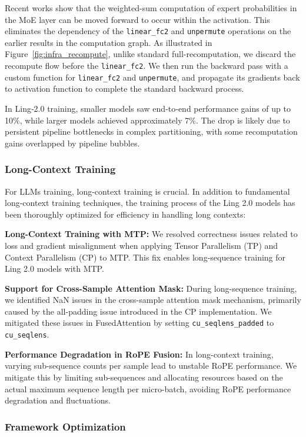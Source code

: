 Recent works show that the weighted-sum computation of expert probabilities in the MoE layer can be moved forward to occur within the activation. This eliminates the dependency of the \verb|linear_fc2| and \verb|unpermute| operations on the earlier results in the computation graph.
As illustrated in Figure~\ref{fig:infra_recompute}, unlike standard full-recomputation, we discard the recompute flow before the \verb|linear_fc2|. We then run the backward pass with a custom function for \verb|linear_fc2| and \verb|unpermute|, and propagate its gradients back to activation function to complete the standard backward process.

In Ling‑2.0 training, smaller models saw end‑to‑end performance gains of up to 10\%, while larger models achieved approximately 7\%. The drop is likely due to persistent pipeline bottlenecks in complex partitioning, with some recomputation gains overlapped by pipeline bubbles.

\subsubsection{Long-Context Training}

For LLMs training, long-context training is crucial. In addition to fundamental long-context training techniques, the training process of the Ling 2.0 models has been thoroughly optimized for efficiency in handling long contexts:

\textbf{Long-Context Training with MTP:} We resolved correctness issues related to loss and gradient misalignment when applying Tensor Parallelism (TP) and Context Parallelism (CP) to MTP. This fix enables long-sequence training for Ling 2.0 models with MTP.

\textbf{Support for Cross-Sample Attention Mask:} During long-sequence training, we identified NaN issues in the cross-sample attention mask mechanism, primarily caused by the all-padding issue introduced in the CP implementation. We mitigated these issues in FusedAttention by setting \verb|cu_seqlens_padded| to \verb|cu_seqlens|.

\textbf{Performance Degradation in RoPE Fusion:} In long-context training, varying sub-sequence counts per sample lead to unstable RoPE performance. We mitigate this by limiting sub-sequences and allocating resources based on the actual maximum sequence length per micro-batch, avoiding RoPE performance degradation and fluctuations.

\subsubsection{Framework Optimization}

